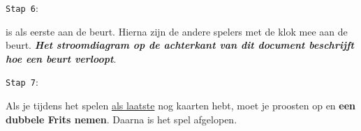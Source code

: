 \noindent
\begin{minipage}[t]{.09\textwidth}
\texttt{Stap 6}:
\end{minipage}
\hfill
\begin{minipage}[t]{.91\textwidth}
\Willem is als eerste aan de beurt. Hierna zijn de andere spelers met de klok mee aan de beurt. \textbf{\textit{Het stroomdiagram op de achterkant van dit document beschrijft hoe een beurt verloopt}}. \\
\end{minipage}

\noindent
\begin{minipage}[t]{.09\textwidth}
\texttt{Stap 7}:
\end{minipage}
\hfill
\begin{minipage}[t]{.91\textwidth}
Als je tijdens het spelen \ul{als laatste} nog kaarten hebt, moet je proosten op  en \textbf{een dubbele Frits nemen}. Daarna is het spel afgelopen.  \\
\end{minipage}


\newpage
{}
\vspace*{0.2cm}
\noindent
\begin{minipage}[t]{.48\textwidth}
\end{minipage}%
\hfill \vrule \hfill
\begin{minipage}[t]{.48\textwidth}
\end{minipage}

